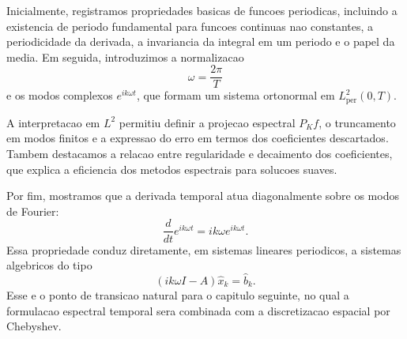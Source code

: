 Inicialmente, registramos propriedades basicas de funcoes periodicas, incluindo
a existencia de periodo fundamental para funcoes continuas nao constantes, a
periodicidade da derivada, a invariancia da integral em um periodo e o papel da
media. Em seguida, introduzimos a normalizacao
\[
\omega=\frac{2\pi}{T}
\]
e os modos complexos \(e^{ik\omega t}\), que formam um sistema ortonormal em
\(L^2_{\mathrm{per}}(0,T)\).

A interpretacao em \(L^2\) permitiu definir a projecao espectral \(P_Kf\), o
truncamento em modos finitos e a expressao do erro em termos dos coeficientes
descartados. Tambem destacamos a relacao entre regularidade e decaimento dos
coeficientes, que explica a eficiencia dos metodos espectrais para solucoes
suaves.

Por fim, mostramos que a derivada temporal atua diagonalmente sobre os modos de
Fourier:
\[
\frac{d}{dt}e^{ik\omega t}=ik\omega e^{ik\omega t}.
\]
Essa propriedade conduz diretamente, em sistemas lineares periodicos, a
sistemas algebricos do tipo
\[
(ik\omega I-A)\widehat x_k=\widehat b_k.
\]
Esse e o ponto de transicao natural para o capitulo seguinte, no qual a
formulacao espectral temporal sera combinada com a discretizacao espacial por
Chebyshev.
